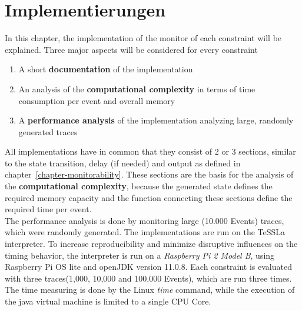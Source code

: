 
\chapter{Implementierungen}
\label{chapter-implementation}

	In this chapter, the implementation of the monitor of each constraint will be explained. Three major aspects will be considered for every constraint
	\begin{enumerate}[1.]
		\item
			A short \textbf{documentation} of the implementation
		\item
			An analysis of the \textbf{computational complexity} in terms of time consumption per event and overall memory
		\item
			A \textbf{performance analysis} of the implementation analyzing large, randomly generated traces
	\end{enumerate}

	 All implementations have in common that they consist of 2 or 3 sections, similar to the state transition, delay (if needed) and output as defined in chapter~\ref{chapter-monitorability}. These sections are the basis for the analysis of the \textbf{computational complexity}, because the generated state defines the required memory capacity and the function connecting these sections define the required time per event.\\
	 The performance analysis is done by monitoring large (10.000 Events) traces, which were randomly generated. The implementations are run on the TeSSLa interpreter. To increase reproducibility and minimize disruptive influences on the timing behavior, the interpreter is run on a \emph{Raspberry Pi 2 Model B}, using Raspberry Pi OS lite and openJDK version 11.0.8. Each constraint is evaluated with three traces(1,000, 10,000 and 100,000 Events), which are run three times. The time measuring is done by the Linux \emph{time} command, while the execution of the java virtual machine is limited to a single CPU Core.
	
	 
